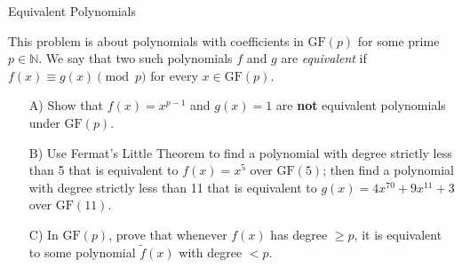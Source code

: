 \begin{homeworkProblem}{Equivalent Polynomials}

    This problem is about polynomials with coefficients in $\text{GF}(p)$ for some 
    prime $p \in \mathbb{N}$. We say that two such polynomials $f$ and $g$ are 
    \emph{equivalent} if $f(x) \equiv g(x) \pmod{p}$ for every $x \in \text{GF}(p)$. 

    \begin{itemize}
        \item[A)] Show that $f(x)=x^{p-1}$ and $g(x)=1$ are \textbf{not} equivalent
        polynomials under $\text{GF}(p).$
        \item[B)] Use Fermat's Little Theorem to find a polynomial with degree 
        strictly less than 5 that is equivalent to $f(x) = x^5$ over $\text{GF}(5)$; 
        then find a polynomial with degree strictly less than 11 that is equivalent 
        to $g(x) = 4x^{70} + 9x^{11} + 3$ over $\text{GF}(11)$.
        \item[C)] In $\mathrm{GF}(p)$, prove that whenever $f(x)$ has degree $\ge 
        p$, it is equivalent to some polynomial $\tilde f(x)$ with degree $< p$.
    \end{itemize}

\end{homeworkProblem}